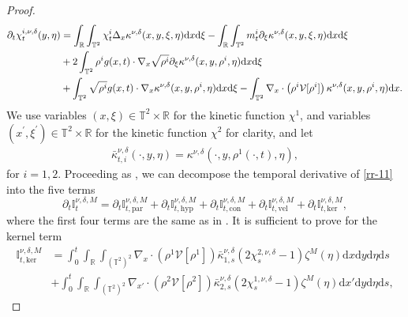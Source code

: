 \begin{proof}
\begin{align}\notag
 \partial_t \chi^{i,\nu,\delta}_t(y,\eta) &= \int_{\mathbb{R}}\int_{\mathbb{T}^2}\chi_t^i\Delta_x\kappa^{\nu,\delta}(x,y,\xi,\eta)\mathrm{d}x\mathrm{d}\xi
  \notag
  -\int_{\mathbb{R}}\int_{\mathbb{T}^2}m^i_t\partial_{\xi}\kappa^{\nu,\delta}(x,y,\xi,\eta)\mathrm{d}x\mathrm{d}\xi\\
  \notag
  &+2\int_{\mathbb{T}^2}\rho^ig(x,t)\cdot\nabla_x\sqrt{\rho^i}\partial_{\xi}\kappa^{\nu,\delta}(x,y,\rho^i,\eta)\mathrm{d}x\mathrm{d}\xi\\
  &+\int_{\mathbb{T}^2}\sqrt{\rho^i}g(x,t)\cdot\nabla_x\kappa^{\nu,\delta}(x,y,\rho^i,\eta)\mathrm{d}x\mathrm{d}\xi -\int_{\mathbb{T}^2} \nabla_x\cdot\left(\rho^i\mathcal{V}[\rho^i]\right) \kappa^{\nu,\delta}(x,y,\rho^i,\eta)\mathrm{d}x.  \label{kineticsmooth}
\end{align}
We use variables $(x, \xi) \in \mathbb{T}^2 \times \mathbb{R}$ for the kinetic function $\chi^1$, and variables $\left(x^{\prime}, \xi^{\prime}\right) \in \mathbb{T}^2 \times \mathbb{R}$ for the kinetic function $\chi^2$ for clarity, and let
\begin{align*}
\bar{\kappa}_{t, i}^{\nu, \delta}(\cdot, y, \eta)=\kappa^{\nu, \delta}\left(\cdot, y, \rho^1(\cdot, t), \eta\right),
\end{align*}
for $i = 1,2$. Proceeding as \cite[Theorem 3.3]{FG},  we can decompose the temporal derivative of \eqref{rr-11} into the five terms
\begin{equation}\label{full}
  \partial_t\mathbb{I}^{\nu,\delta,M}_t=\partial_t\mathbb{I}^{\nu,\delta,M}_{t,\mathrm{par}}
  +\partial_t\mathbb{I}^{\nu,\delta,M}_{t,\mathrm{hyp}}+\partial_t\mathbb{I}^{\nu,\delta,M}_{t,\mathrm{con}}
  +\partial_t\mathbb{I}^{\nu,\delta,M}_{t,\mathrm{vel}}+\partial_t\mathbb{I}^{\nu,\delta,M}_{t,\mathrm{ker}},
\end{equation}
where the first four terms are the same as in \cite[(3.10)]{FG}. It is sufficient to prove for the kernel term
\begin{align}\label{t-1}
\mathbb{I}^{\nu,\delta,M}_{t,\mathrm{ker}} &= \int_0^t \int_{\mathbb{R}}\int_{(\mathbb{T}^2)^2} \nabla_x\cdot \left( \rho^1 \mathcal{V}[\rho^1] \right) \bar{\kappa}^{\nu,\delta}_{1,s}\left(2\chi_s^{2,\nu,\delta}-1\right)\zeta^M(\eta)\mathrm{d}x\mathrm{d}y\mathrm{d}\eta \mathrm{d}s\nonumber\\
 & + \int_0^t\int_{\mathbb{R}}\int_{(\mathbb{T}^2)^2} \nabla_{x'}\cdot \left(\rho^2 \mathcal{V}[\rho^2]\right) \bar{\kappa}^{\nu,\delta}_{2,s}\left(2\chi_s^{1,\nu,\delta}-1\right)\zeta^M(\eta)\mathrm{d}x'\mathrm{d}y\mathrm{d}\eta  \mathrm{d}s,

\end{align}
\end{proof}
